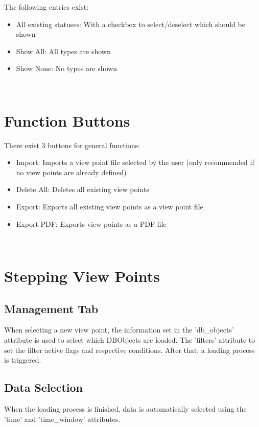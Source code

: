 The following entries exist:

\begin{itemize}  
\item All existing statuses: With a checkbox to select/deselect which should be shown
\item Show All: All types are shown
\item Show None: No types are shown
\end{itemize}
\ \\

\section{Function Buttons}

There exist 3 buttons for general functions:

\begin{itemize}  
\item Import: Imports a view point file selected by the user (only recommended if no view points are already defined)
\item Delete All: Deletes all existing view points
\item Export: Exports all existing view points as a view point file
\item Export PDF: Exports view points as a PDF file
\end{itemize}
\ \\

\section{Stepping View Points}

\subsection{Management Tab} 
When selecting a new view point, the information set in the 'db\_objects' attribute is used to select which DBObjects are loaded. The 'filters' attribute to set the filter active flags and respective conditions. After that, a loading process is triggered. \\

\subsection{Data Selection}

When the loading process is finished, data is automatically selected using the 'time' and 'time\_window' attributes.

